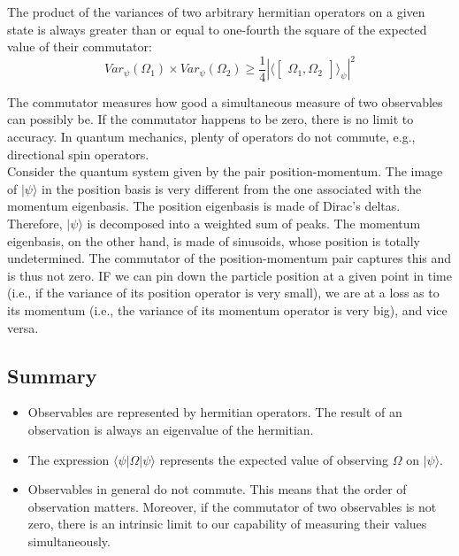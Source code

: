 \documentclass{article}
\begin{document}
The product of the variances of two arbitrary hermitian operators on a given state is always greater than or equal to one-fourth the square of the expected value of their commutator:
\begin{equation}
    Var_\psi(\Omega_1) \times Var_\psi(\Omega_2) \geq \frac{1}{4}|
    \langle
    \begin{bmatrix}
    \Omega_1, \Omega_2
    \end{bmatrix}
    \rangle_\psi|^2
\end{equation}

The commutator measures how good a simultaneous measure of two observables can possibly be. If the commutator happens to be zero, there is no limit to accuracy. In quantum mechanics, plenty of operators do not commute, e.g., directional spin operators. \\

Consider the quantum system given by the pair position-momentum. The image of $|\psi\rangle$ in the position basis is very different from the one associated with the momentum eigenbasis. The position eigenbasis is made of Dirac's deltas. Therefore, $|\psi\rangle$ is decomposed into a weighted sum of peaks. The momentum eigenbasis, on the other hand, is made of sinusoids, whose position is totally undetermined. The commutator of the position-momentum pair captures this and is thus not zero. IF we can pin down the particle position at a given point in time (i.e., if the variance of its position operator is very small), we are at a loss as to its momentum (i.e., the variance of its momentum operator is very big), and vice versa.

\subsection{Summary}
\begin{itemize}
    \item Observables are represented by hermitian operators. The result of an observation is always an eigenvalue of the hermitian.
    \item The expression $\langle\psi|\Omega|\psi\rangle$ represents the expected value of observing $\Omega$ on $|\psi\rangle$.
    \item Observables in general do not commute. This means that the order of observation matters. Moreover, if the commutator of two observables is not zero, there is an intrinsic limit to our capability of measuring their values simultaneously.
\end{itemize}
\end{document}
